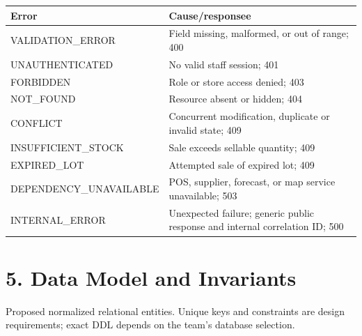 {\def\LTcaptype{none} %
\begin{longtable}[]{|
  >{\raggedright\arraybackslash}m{}|
  >{\raggedright\arraybackslash}m{}|}
\hline
\begin{minipage}[c]{\linewidth}\raggedright
\textbf{Error}
\end{minipage} & \begin{minipage}[c]{\linewidth}\raggedright
\textbf{Cause/responsee}
\end{minipage} \\
\hline
\endhead

\endlastfoot
VALIDATION\_ERROR & Field missing, malformed, or out of range; 400 \\ \hline
UNAUTHENTICATED & No valid staff session; 401 \\ \hline
FORBIDDEN & Role or store access denied; 403 \\ \hline
NOT\_FOUND & Resource absent or hidden; 404 \\ \hline
CONFLICT & Concurrent modification, duplicate or invalid state; 409 \\ \hline
INSUFFICIENT\_STOCK & Sale exceeds sellable quantity; 409 \\ \hline
EXPIRED\_LOT & Attempted sale of expired lot; 409 \\ \hline
DEPENDENCY\_UNAVAILABLE & POS, supplier, forecast, or map service unavailable; 503 \\ \hline
INTERNAL\_ERROR & Unexpected failure; generic public response and internal correlation ID; 500 \\ \hline
\end{longtable}
}








\clearpage
\section{5. Data Model and Invariants}\label{data-model-and-invariants}

Proposed normalized relational entities. Unique keys and constraints are design requirements; exact DDL depends on the team's database selection.

